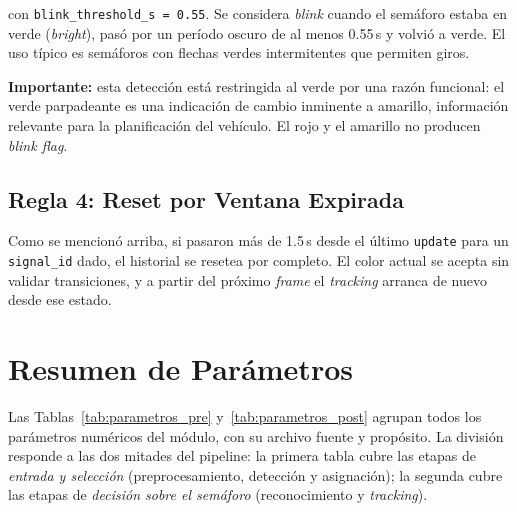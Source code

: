 con \texttt{blink\_threshold\_s = 0.55}. Se considera \textit{blink} cuando el semáforo estaba en verde (\textit{bright}), pasó por un período oscuro de al menos 0.55\,s y volvió a verde. El uso típico es semáforos con flechas verdes intermitentes que permiten giros.

\textbf{Importante:} esta detección está restringida al verde por una razón funcional: el verde parpadeante es una indicación de cambio inminente a amarillo, información relevante para la planificación del vehículo. El rojo y el amarillo no producen \textit{blink flag}.

\subsection{Regla 4: Reset por Ventana Expirada}

Como se mencionó arriba, si pasaron más de 1.5\,s desde el último \texttt{update} para un \texttt{signal\_id} dado, el historial se resetea por completo. El color actual se acepta sin validar transiciones, y a partir del próximo \textit{frame} el \textit{tracking} arranca de nuevo desde ese estado.

\section{Resumen de Parámetros}

Las Tablas~\ref{tab:parametros_pre} y~\ref{tab:parametros_post} agrupan todos los parámetros numéricos del módulo, con su archivo fuente y propósito. La división responde a las dos mitades del pipeline: la primera tabla cubre las etapas de \textit{entrada y selección} (preprocesamiento, detección y asignación); la segunda cubre las etapas de \textit{decisión sobre el semáforo} (reconocimiento y \textit{tracking}).

